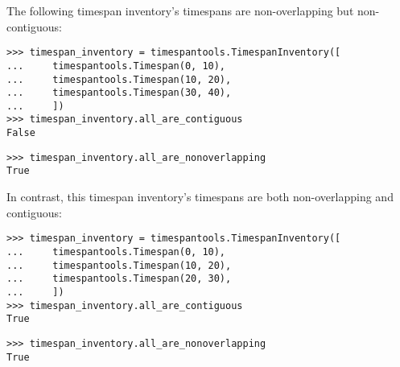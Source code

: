 \noindent The following timespan inventory's timespans are non-overlapping but
non-contiguous:

\begin{comment}
<abjad>
timespan_inventory = timespantools.TimespanInventory([
    timespantools.Timespan(0, 10),
    timespantools.Timespan(10, 20),
    timespantools.Timespan(30, 40),
    ])
timespan_inventory.all_are_contiguous
timespan_inventory.all_are_nonoverlapping
</abjad>
\end{comment}

\begin{singlespacing}
\vspace{-0.5\baselineskip}
\begin{lstlisting}
>>> timespan_inventory = timespantools.TimespanInventory([
...     timespantools.Timespan(0, 10),
...     timespantools.Timespan(10, 20),
...     timespantools.Timespan(30, 40),
...     ])
>>> timespan_inventory.all_are_contiguous
False
\end{lstlisting}
\begin{lstlisting}
>>> timespan_inventory.all_are_nonoverlapping
True
\end{lstlisting}
\end{singlespacing}

\noindent In contrast, this timespan inventory's timespans are both
non-overlapping and contiguous:

\begin{comment}
<abjad>
timespan_inventory = timespantools.TimespanInventory([
    timespantools.Timespan(0, 10),
    timespantools.Timespan(10, 20),
    timespantools.Timespan(20, 30),
    ])
timespan_inventory.all_are_contiguous
timespan_inventory.all_are_nonoverlapping
</abjad>
\end{comment}

\begin{singlespacing}
\vspace{-0.5\baselineskip}
\begin{lstlisting}
>>> timespan_inventory = timespantools.TimespanInventory([
...     timespantools.Timespan(0, 10),
...     timespantools.Timespan(10, 20),
...     timespantools.Timespan(20, 30),
...     ])
>>> timespan_inventory.all_are_contiguous
True
\end{lstlisting}
\begin{lstlisting}
>>> timespan_inventory.all_are_nonoverlapping
True
\end{lstlisting}
\end{singlespacing}

